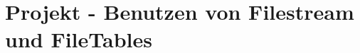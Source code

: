 \clearpage
    \section{Projekt - Benutzen von Filestream und FileTables}
      \begin{enumerate}
        

        
        
        
        
        
        
        
      \end{enumerate}